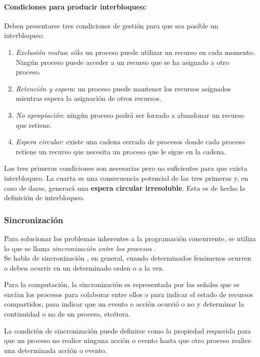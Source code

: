 \paragraph{Condiciones para producir interbloqueo: }
\noindent Deben presentarse tres condiciones de gestión para que sea posible un interbloqueo:
\begin{enumerate}
    \item \textit{Exclusión mutua}: sólo un proceso puede utilizar un recurso en cada momento. Ningún proceso puede acceder a un recurso que se ha asignado a otro proceso.
    
    \item \textit{Retención y espera}: un proceso puede mantener los recursos asignados mientras espera la asignación de otros recursos.
    
    \item \textit{No apropiación}: ningún proceso podrá ser forzado a abandonar un recurso que retiene.
    
    \item \textit{Espera circular}: existe una cadena cerrada de procesos donde cada proceso retiene un recurso que necesita un proceso que le sigue en la cadena.
\end{enumerate}

Las tres primeras condiciones son necesarias pero no suficientes para que exista interbloqueo.
La cuarta es una consecuencia potencial de las tres primeras y, en caso de darse, generará una \textbf{espera circular irresoluble}. Esta es de hecho la definición de interbloqueo.

\subsubsection{Sincronización}
Para solucionar los problemas inherentes a la programación concurrente, se utiliza lo que se llama \textit{sincronización entre los procesos} . \\
Se habla de sincronización , en general, cuando determinados fenómenos ocurren o deben ocurrir en un determinado orden o a la vez.
\par Para la computación, la sincronización es representada por las señales que se envían los procesos para colaborar entre ellos o para indicar el estado de recursos compartidos, para indicar que un evento o acción ocurrió o no y determinar la continuidad o no de un proceso, etcétera.
\par La condición de sincronización puede definirse como la propiedad requerida para que un proceso no realice ninguna acción o evento hasta que otro proceso realice una determinada acción o evento.

